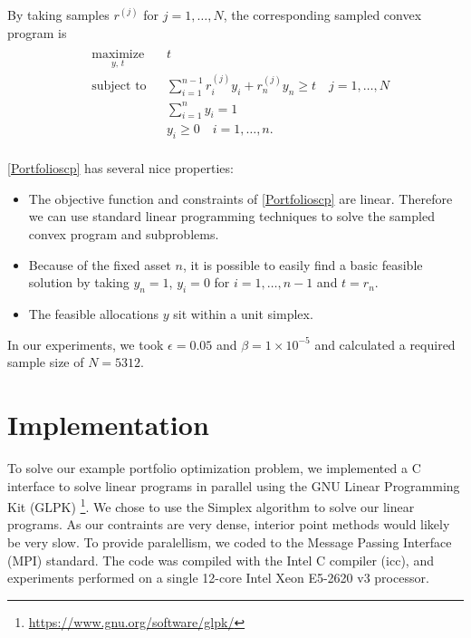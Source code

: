 \documentclass[12pt]{article}
\begin{document}
By taking samples $r^{(j)}$ for $j = 1, \ldots, N$, the corresponding sampled convex program is 
\begin{align}\label{Portfolioscp}
\begin{split}
\begin{aligned}
    & \underset{y, \,t}{\text{maximize}}
    & & t \\
    & \text{subject to}
    & & \sum_{i=1}^{n-1} r_i^{(j)} y_i + r_n^{(j)} y_n \geq t \quad j = 1, \ldots, N \\
    & & & \sum_{i=1}^n y_i = 1 \\
    & & & y_i \geq 0 \quad i = 1, \ldots, n.
\end{aligned}
\end{split} \tag{Portfolio SCP$_N$}
\end{align}


\ref{Portfolioscp} has several nice properties:
\begin{itemize}
\item The objective function and constraints of \ref{Portfolioscp} are linear. Therefore we can use standard linear programming techniques to solve the sampled convex program and subproblems.
\item Because of the fixed asset $n$, it is possible to easily find a basic feasible solution by taking $y_n = 1$, $y_i = 0$ for $i = 1, \ldots, n-1$ and $t = r_n$.
\item The feasible allocations $y$ sit within a unit simplex.
\end{itemize}

In our experiments, we took $\epsilon = 0.05$ and $\beta = 1 \times 10^{-5}$ and calculated a required sample size of $N = 5312$.

\section*{Implementation}

To solve our example portfolio optimization problem, we implemented a C interface to solve linear programs in parallel using the GNU Linear Programming Kit (GLPK) \footnote{\url{https://www.gnu.org/software/glpk/}}.
We chose to use the Simplex algorithm to solve our linear programs.  
As our contraints are very dense, interior point methods would likely be very slow.
To provide paralellism, we coded to the Message Passing Interface (MPI) standard.
The code was compiled with the Intel C compiler (icc), and experiments performed on a single 12-core Intel Xeon E5-2620 v3 processor.
\end{document}
